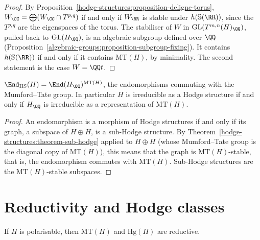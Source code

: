 \begin{proof}
By Proposition~\ref{hodge-structures:proposition-deligne-torus}, $W_\CC = \bigoplus(W_\CC \cap T^{p,q})$ if and only if $W_\RR$ is stable under $h(\mathbb{S}(\RR))$, since the $T^{p,q}$ are the
eigenspaces of the torus. The stabiliser of $W$ in $\mathrm{GL}(T^{m,n}(H)_\QQ)$, pulled back to $\mathrm{GL}(H_\QQ)$, is an algebraic subgroup defined over $\QQ$
(Proposition~\ref{algebraic-groups:proposition-subgroup-fixing}). It contains $h(\mathbb{S}(\RR))$ if and only if it contains $\mathrm{MT}(H)$, by minimality. The second statement is the case
$W = \QQ t$.
\end{proof}

\begin{corollary}\label{hodge-structures:corollary-endomorphisms}
$\End_{\mathrm{HS}}(H) = \End(H_\QQ)^{\mathrm{MT}(H)}$, the endomorphisms commuting with the Mumford--Tate group. In particular $H$ is irreducible as a Hodge structure if and only if $H_\QQ$ is
irreducible as a representation of $\mathrm{MT}(H)$.
\end{corollary}

\begin{proof}
An endomorphism is a morphism of Hodge structures if and only if its graph, a subspace of $H \oplus H$, is a sub-Hodge structure. By Theorem~\ref{hodge-structures:theorem-sub-hodge} applied to $H \oplus H$
(whose Mumford--Tate group is the diagonal copy of $\mathrm{MT}(H)$), this means that the graph is $\mathrm{MT}(H)$-stable, that is, the endomorphism commutes with $\mathrm{MT}(H)$. Sub-Hodge
structures are the $\mathrm{MT}(H)$-stable subspaces.
\end{proof}

\section{Reductivity and Hodge classes}\label{hodge-structures:section-reductive}

\begin{theorem}\label{hodge-structures:theorem-reductive}
If $H$ is polarisable, then $\mathrm{MT}(H)$ and $\mathrm{Hg}(H)$ are reductive.
\end{theorem}

